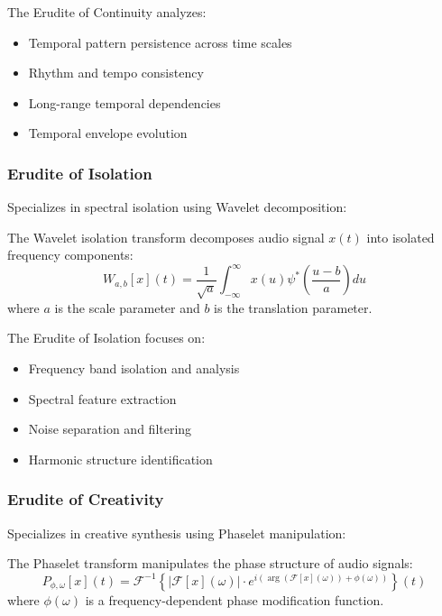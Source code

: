 The Erudite of Continuity analyzes:
\begin{itemize}
    \item Temporal pattern persistence across time scales
    \item Rhythm and tempo consistency
    \item Long-range temporal dependencies
    \item Temporal envelope evolution
\end{itemize}

\subsubsection{Erudite of Isolation}
Specializes in spectral isolation using Wavelet decomposition:

\begin{definition}
The Wavelet isolation transform decomposes audio signal $x(t)$ into isolated frequency components:
\begin{equation}
W_{a,b}[x](t) = \frac{1}{\sqrt{a}} \int_{-\infty}^{\infty} x(u) \psi^*\left(\frac{u-b}{a}\right) du
\end{equation}
where $a$ is the scale parameter and $b$ is the translation parameter.
\end{definition}

The Erudite of Isolation focuses on:
\begin{itemize}
    \item Frequency band isolation and analysis
    \item Spectral feature extraction
    \item Noise separation and filtering
    \item Harmonic structure identification
\end{itemize}

\subsubsection{Erudite of Creativity}
Specializes in creative synthesis using Phaselet manipulation:

\begin{definition}
The Phaselet transform manipulates the phase structure of audio signals:
\begin{equation}
P_{\phi,\omega}[x](t) = \mathcal{F}^{-1}\left\{|\mathcal{F}[x](\omega)| \cdot e^{i(\arg(\mathcal{F}[x](\omega)) + \phi(\omega))}\right\}(t)
\end{equation}
where $\phi(\omega)$ is a frequency-dependent phase modification function.
\end{definition}

